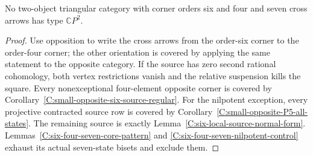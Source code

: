 \begin{theorem}
\label{C:six-four-seven-excluded}
No two-object triangular category with corner orders
six and four and seven cross arrows has type
$\mathbb CP^2$.
\end{theorem}
\begin{proof}
Use opposition to write the cross arrows from the
order-six corner to the order-four corner; the other
orientation is covered by applying the same statement
to the opposite category.
If the source has zero second rational cohomology,
both vertex restrictions vanish and the relative
suspension kills the square.
Every nonexceptional four-element opposite corner
is covered by
Corollary~\ref{C:small-opposite-six-source-regular}.
For the nilpotent exception, every projective contracted
source row is covered by
Corollary~\ref{C:small-opposite-P5-all-states}.
The remaining source is exactly
Lemma~\ref{C:six-local-source-normal-form}.
Lemmas~\ref{C:six-four-seven-core-pattern} and
\ref{C:six-four-seven-nilpotent-control} exhaust its
actual seven-state bisets and exclude them.
\end{proof}
